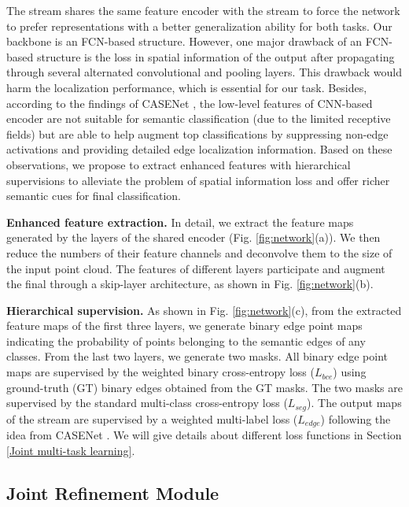 \documentclass[runningheads]{llncs}
\begin{document}
The {{\SemEdgeD}} stream shares the same feature encoder with the {{\SemSeg}} stream to force the network to prefer representations with {a} better generalization ability for both tasks. Our backbone is an FCN-based structure. However, one {major} 
drawback of {an} FCN-based structure is the loss in spatial information of the output after propagating through several alternated convolutional and pooling layers. {This drawback would} harm the localization performance, which is essential for our {\SemEdgeD} task. Besides, according to the findings of CASENet \cite{yu2017casenet}, the {low}{-}level
features of CNN-based encoder are not suitable for semantic classification (due to the limited receptive fields) but {are able to} help augment top classifications by suppressing non-edge activations and providing detailed edge localization information. Based on these observations, we propose to extract enhanced features with hierarchical supervisions 
to alleviate the problem of spatial information loss and offer richer semantic cues for final classification.

{
\smallskip \noindent \textbf{Enhanced feature extraction.}
In detail, we extract the feature maps generated by the layers of the shared encoder (Fig. \ref{fig:network}(a)). We then reduce the numbers of their feature channels and deconvolve them to the size of the input point cloud. The features of different layers participate and augment the final {\SemEdgeD} through a skip-layer architecture, as shown in Fig. \ref{fig:network}(b).

\smallskip \noindent \textbf{Hierarchical supervision.}
As shown in Fig. \ref{fig:network}(c), from the extracted feature maps of the first three layers, we generate binary edge point maps indicating the probability of points belonging to the semantic edges of any classes. From the last two layers, we generate two {\SemSegPoint} masks. 
All binary edge point maps are supervised by the weighted binary cross-entropy loss ($L_{bce}$) using ground-truth (GT) binary edges obtained from {the} GT {\SemSegPoint} masks. The two {\SemSegPoint} masks are supervised by the standard multi-class cross-entropy loss ($L_{seg}$). The output {\SemEdgePoint} maps of the {{\SemEdgeD}} stream are supervised by a weighted multi-label loss ($L_{edge}$) following the idea from CASENet \cite{yu2017casenet}. We will give details about different loss functions in Section \ref{Joint multi-task learning}.
} 
\subsection{Joint Refinement Module} \label{Joint refinement module}
\end{document}
